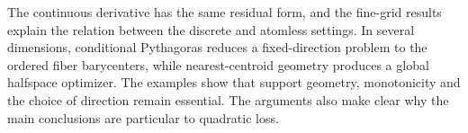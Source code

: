 \documentclass[a4paper]{amsart}
\numberwithin{equation}{section}
\theoremstyle{remark}
\newcommand{\1}{\mathbf 1}
\begin{document}
The continuous derivative has the same residual form, and the fine-grid
results explain the relation between the discrete and atomless settings.  In
several dimensions, conditional Pythagoras reduces a fixed-direction problem
to the ordered fiber barycenters, while nearest-centroid geometry produces a
global halfspace optimizer.  The examples show that support geometry,
monotonicity and the choice of direction remain essential.  The arguments also
make clear why the main conclusions are particular to quadratic loss.



\end{document}
